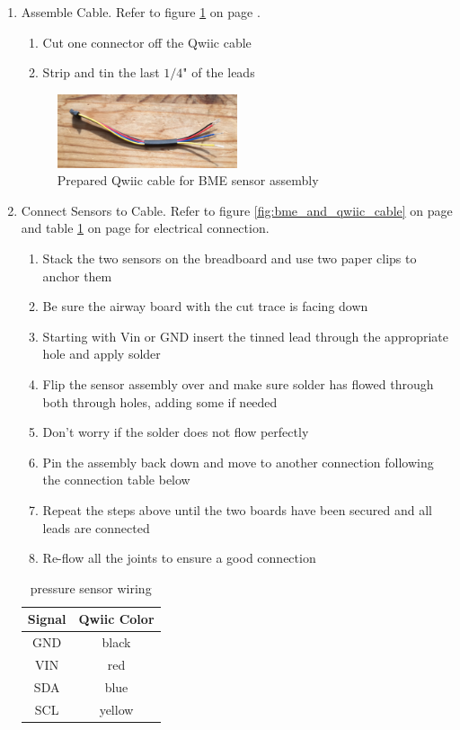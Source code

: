 \documentclass[11pt, letterpaper]{article}
\begin{document}
\begin{enumerate}
\begin{enumerate}[label=3.\arabic*]
\item
Assemble Cable. Refer to figure \ref{fig:bme_qwiic_cable} on page \pageref{fig:bme_qwiic_cable}.
\begin{enumerate}[label=3.3.\arabic*]
\item
Cut one connector off the Qwiic cable
\item
Strip and tin the last $1/4$" of the leads
\end{enumerate}
\begin{figure}[H]
\centering
\includegraphics[width=0.5\textwidth]{images/bme_qwiic_cable.JPG}
\caption{Prepared Qwiic cable for BME sensor assembly}
\label{fig:bme_qwiic_cable}
\end{figure}
\item
Connect Sensors to Cable. Refer to figure \ref{fig:bme_and_qwiic_cable} on page \pageref{fig:bme_and_qwiic_cable} and table \ref{tab:pressure} on page \pageref{tab:pressure} for electrical connection.
\begin{enumerate}[label=3.4.\arabic*]
\item
Stack the two sensors on the breadboard and use two paper clips to anchor them
\item
Be sure the airway board with the cut trace is facing down
\item
Starting with Vin or GND insert the tinned lead through the appropriate hole and apply solder
\item
Flip the sensor assembly over and make sure solder has flowed through both through holes, adding some if needed
\item
Don't worry if the solder does not flow perfectly
\item
Pin the assembly back down and move to another connection following the connection table below
\item
Repeat the steps above until the two boards have been secured and all leads are connected
\item
Re-flow all the joints to ensure a good connection
\end{enumerate}

\begin{table}[H]
\centering
\begin{tabular}{| c | c |}
\hline
Signal & Qwiic Color\\  \hline
GND & black  \\  \hline
VIN & red \\  \hline
SDA & blue \\  \hline
SCL & yellow \\
\hline
\end{tabular}
\caption{pressure sensor wiring}
\label{tab:pressure}
\end{table}


\end{enumerate}
\end{enumerate}
\end{document}

